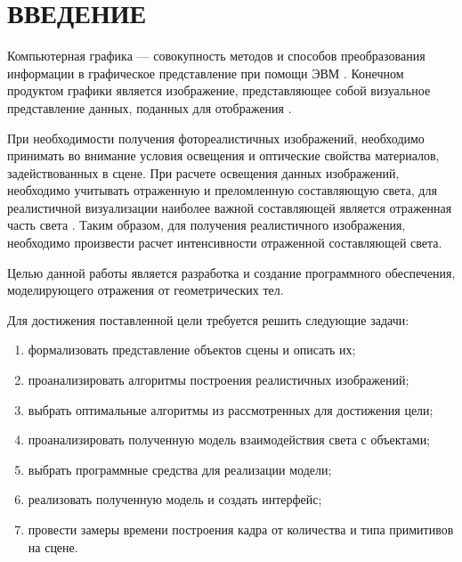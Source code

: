 \chapter*{ВВЕДЕНИЕ}


Компьютерная графика --- совокупность методов и способов преобразования информации в графическое представление при помощи ЭВМ \cite{compgraph_importance}.
Конечном продуктом графики является изображение, представляющее собой визуальное представление данных, поданных для отображения \cite{Rodgers}. 

При необходимости получения фотореалистичных изображений, необходимо принимать во внимание условия освещения и оптические свойства материалов, задействованных в сцене. При расчете освещения данных изображений, необходимо учитывать отраженную  и преломленную составляющую света, для реалистичной визуализации наиболее важной составляющей является отраженная часть света \cite{compgraph_usage,real_images}. Таким образом, для получения реалистичного изображения, необходимо произвести расчет интенсивности отраженной составляющей света.


Целью данной работы является разработка и создание программного обеспечения, моделирующего отражения от геометрических тел.

Для достижения поставленной цели требуется решить следующие задачи:
\begin{enumerate}
	\item формализовать представление объектов сцены и описать их;
	\item проанализировать алгоритмы построения реалистичных изображений;
	\item выбрать оптимальные алгоритмы из рассмотренных для достижения цели;
	\item проанализировать полученную  модель взаимодействия света с объектами;
	\item выбрать программные средства для реализации модели;
	\item реализовать полученную модель и создать интерфейс;
	\item провести замеры времени построения кадра от количества и типа примитивов на сцене.
\end{enumerate}
